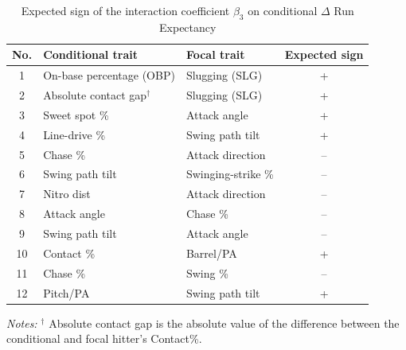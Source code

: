 \begin{table}[htbp]
\centering
\caption{Expected sign of the interaction coefficient $\beta_3$ on conditional $\Delta$ Run Expectancy}
\label{tab:expectations_cond}
\begin{tabular}{c l l c}
\toprule
No. & Conditional trait & Focal trait & Expected sign \\
\midrule
1 & On-base percentage (OBP) & Slugging (SLG) & + \\
2 & Absolute contact gap$^{\dagger}$ & Slugging (SLG) & + \\
3 & Sweet spot \% & Attack angle & + \\
4 & Line-drive \% & Swing path tilt & + \\
5 & Chase \% & Attack direction & -- \\
6 & Swing path tilt & Swinging-strike \% & -- \\
7 & Nitro dist & Attack direction & -- \\
8 & Attack angle & Chase \% & -- \\
9 & Swing path tilt & Attack angle & -- \\
10 & Contact \% & Barrel/PA & + \\
11 & Chase \% & Swing \% & -- \\
12 & Pitch/PA & Swing path tilt & + \\
\bottomrule
\end{tabular}

\vspace{4pt}
\begin{minipage}{0.8\textwidth}
\centering
\footnotesize
\textit{Notes:} $^{\dagger}$ Absolute contact gap is the absolute value of the difference between the conditional and focal hitter's Contact\%.
\end{minipage}
\end{table}
